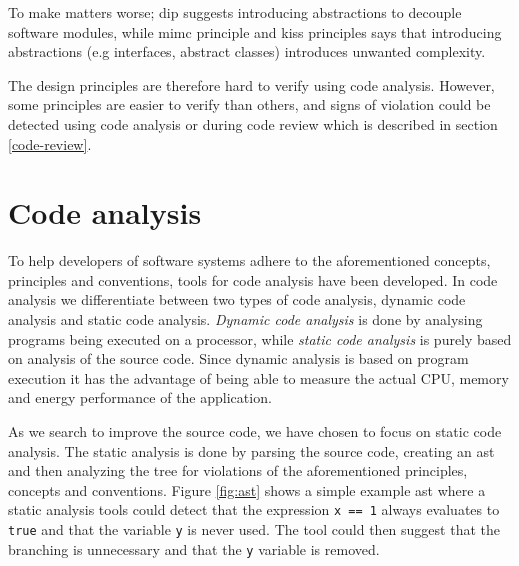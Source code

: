 \documentclass{report}
\begin{document}
To make matters worse; \gls{dip} suggests introducing abstractions to decouple software modules, while \gls{mimc} principle and \gls{kiss} principles says that introducing abstractions (e.g interfaces, abstract classes) introduces unwanted complexity.

The design principles are therefore hard to verify using code analysis. However, some principles are easier to verify than others, and signs of violation could be detected using code analysis or during code review which is described in section \ref{code-review}.

\section{Code analysis}
To help developers of software systems adhere to the aforementioned concepts, principles and conventions, tools for code analysis have been developed. In code analysis we differentiate between two types of code analysis, dynamic code analysis and static code analysis. \textit{Dynamic code analysis} is done by analysing programs being executed on a processor, while \textit{static code analysis} is purely based on analysis of the source code. Since dynamic analysis is based on program execution it has the advantage of being able to measure the actual CPU, memory and energy performance of the application. 


As we search to improve the source code, we have chosen to focus on static code analysis. The static analysis is done by parsing the source code, creating an \gls{ast} and then analyzing the tree for violations of the aforementioned principles, concepts and conventions. Figure \ref{fig:ast} shows a simple example \gls{ast} where a static analysis tools could detect that the expression \texttt{x == 1} always evaluates to \texttt{true} and that the variable \texttt{y} is never used. The tool could then suggest that the branching is unnecessary and that the \texttt{y} variable is removed.  
\end{document}

